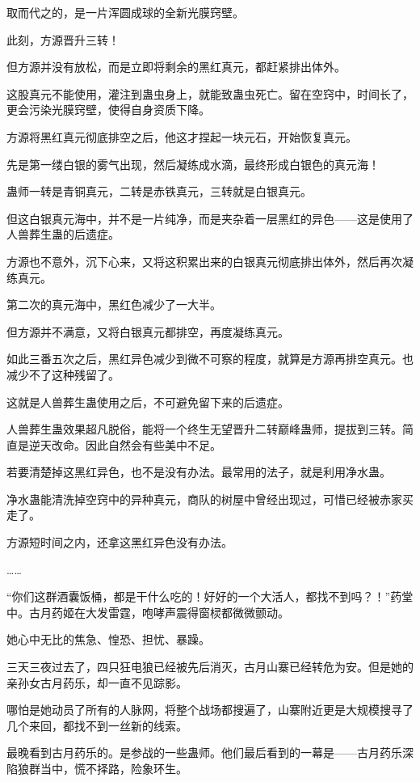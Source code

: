 \begin{this_body}
取而代之的，是一片浑圆成球的全新光膜窍壁。

此刻，方源晋升三转！

但方源并没有放松，而是立即将剩余的黑红真元，都赶紧排出体外。

这股真元不能使用，灌注到蛊虫身上，就能致蛊虫死亡。留在空窍中，时间长了，更会污染光膜窍壁，使得自身资质下降。

方源将黑红真元彻底排空之后，他这才捏起一块元石，开始恢复真元。

先是第一缕白银的雾气出现，然后凝练成水滴，最终形成白银色的真元海！

蛊师一转是青铜真元，二转是赤铁真元，三转就是白银真元。

但这白银真元海中，并不是一片纯净，而是夹杂着一层黑红的异色——这是使用了人兽葬生蛊的后遗症。

方源也不意外，沉下心来，又将这积累出来的白银真元彻底排出体外，然后再次凝练真元。

第二次的真元海中，黑红色减少了一大半。

但方源并不满意，又将白银真元都排空，再度凝练真元。

如此三番五次之后，黑红异色减少到微不可察的程度，就算是方源再排空真元。也减少不了这种残留了。

这就是人兽葬生蛊使用之后，不可避免留下来的后遗症。

人兽葬生蛊效果超凡脱俗，能将一个终生无望晋升二转巅峰蛊师，提拔到三转。简直是逆天改命。因此自然会有些美中不足。

若要清楚掉这黑红异色，也不是没有办法。最常用的法子，就是利用净水蛊。

净水蛊能清洗掉空窍中的异种真元，商队的树屋中曾经出现过，可惜已经被赤家买走了。

方源短时间之内，还拿这黑红异色没有办法。

……

“你们这群酒囊饭桶，都是干什么吃的！好好的一个大活人，都找不到吗？！”药堂中。古月药姬在大发雷霆，咆哮声震得窗棂都微微颤动。

她心中无比的焦急、惶恐、担忧、暴躁。

三天三夜过去了，四只狂电狼已经被先后消灭，古月山寨已经转危为安。但是她的亲孙女古月药乐，却一直不见踪影。

哪怕是她动员了所有的人脉网，将整个战场都搜遍了，山寨附近更是大规模搜寻了几个来回，都找不到一丝新的线索。

最晚看到古月药乐的。是参战的一些蛊师。他们最后看到的一幕是——古月药乐深陷狼群当中，慌不择路，险象环生。


\end{this_body}
